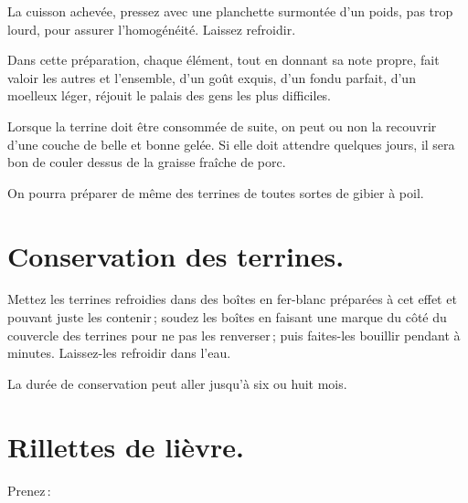La cuisson achevée, pressez avec une planchette surmontée d'un poids, pas trop
lourd, pour assurer l'homogénéité. Laissez refroidir.

Dans cette préparation, chaque élément, tout en donnant sa note propre, fait
valoir les autres et l'ensemble, d'un goût exquis, d’un fondu parfait, d'un
moelleux léger, réjouit le palais des gens les plus difficiles.

\sk

Lorsque la terrine doit être consommée de suite, on peut ou non la recouvrir
d'une couche de belle et bonne gelée. Si elle doit attendre quelques jours, il
sera bon de couler dessus de la graisse fraîche de porc.

\sk

On pourra préparer de même des terrines de toutes sortes de gibier à poil.

\section*{\centering Conservation des terrines.}
{}

Mettez les terrines refroidies dans des boîtes en fer-blanc préparées à cet
effet et pouvant juste les contenir ; soudez les boîtes en faisant une marque
du côté du couvercle des terrines pour ne pas les renverser ; puis faites-les
bouillir pendant {\mmm} à {\mmm} minutes. Laissez-les refroidir
dans l'eau.

La durée de conservation peut aller jusqu'à six ou huit mois.

\section*{\centering Rillettes de lièvre.}
{}

Prenez :

